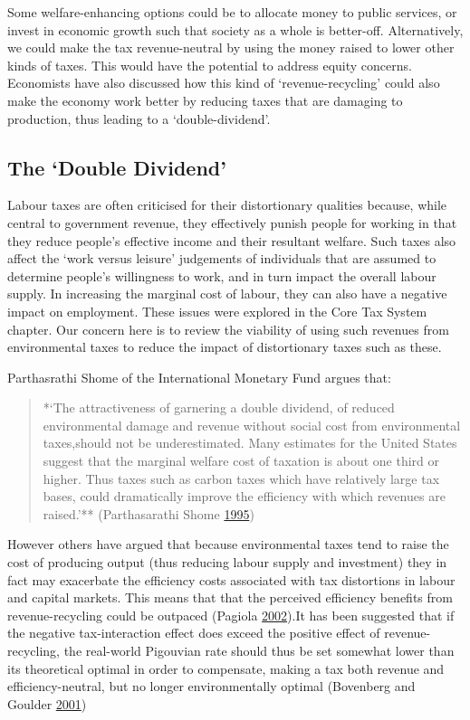 \documentclass[]{tufte-handout}
\begin{document}
Some welfare-enhancing options could be to allocate money to public
services, or invest in economic growth such that society as a whole is
better-off. Alternatively, we could make the tax revenue-neutral by
using the money raised to lower other kinds of taxes. This would have
the potential to address equity concerns. Economists have also discussed
how this kind of `revenue-recycling' could also make the economy work
better by reducing taxes that are damaging to production, thus leading
to a `double-dividend'.

\hypertarget{the-double-dividend}{%
\subsection{The `Double Dividend'}\label{the-double-dividend}}

Labour taxes are often criticised for their distortionary qualities
because, while central to government revenue, they effectively punish
people for working in that they reduce people's effective income and
their resultant welfare. Such taxes also affect the `work versus
leisure' judgements of individuals that are assumed to determine
people's willingness to work, and in turn impact the overall labour
supply. In increasing the marginal cost of labour, they can also have a
negative impact on employment. These issues were explored in the Core
Tax System chapter. Our concern here is to review the viability of using
such revenues from environmental taxes to reduce the impact of
distortionary taxes such as these.

Parthasrathi Shome of the International Monetary Fund argues that:

\begin{quote}
*`The attractiveness of garnering a double dividend, of reduced
environmental damage and revenue without social cost from environmental
taxes,should not be underestimated. Many estimates for the United States
suggest that the marginal welfare cost of taxation is about one third or
higher. Thus taxes such as carbon taxes which have relatively large tax
bases, could dramatically improve the efficiency with which revenues are
raised.'** (Parthasarathi Shome
\protect\hyperlink{ref-ParthasarathiShome}{1995})
\end{quote}

However others have argued that because environmental taxes tend to
raise the cost of producing output (thus reducing labour supply and
investment) they in fact may exacerbate the efficiency costs associated
with tax distortions in labour and capital markets. This means that that
the perceived efficiency benefits from revenue-recycling could be
outpaced (Pagiola \protect\hyperlink{ref-Pagiola2002}{2002}).It has been
suggested that if the negative tax-interaction effect does exceed the
positive effect of revenue-recycling, the real-world Pigouvian rate
should thus be set somewhat lower than its theoretical optimal in order
to compensate, making a tax both revenue and efficiency-neutral, but no
longer environmentally optimal (Bovenberg and Goulder
\protect\hyperlink{ref-Bovenberg2001}{2001})
\end{document}
